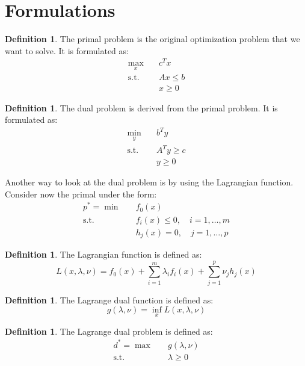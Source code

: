 \documentclass[12pt, openany]{report}
\theoremstyle{definition}
\newtheorem{definition}[thm]{Definition}
\begin{document}
\section{Formulations}
\begin{definition}
    The primal problem is the original optimization problem that we want to solve. It is formulated as:
    \begin{equation}
        \begin{aligned}
            \max_{x} \quad & c^T x \\
            \text{s.t.} \quad & A x \leq b \\
            & x \geq 0
        \end{aligned}
    \end{equation}
\end{definition}
\begin{definition}
    The dual problem is derived from the primal problem. It is formulated as:
    \begin{equation}
        \begin{aligned}
            \min_{y} \quad & b^T y \\
            \text{s.t.} \quad & A^T y \geq c \\
            & y \geq 0
        \end{aligned}
    \end{equation}
\end{definition}
Another way to look at the dual problem is by using the Lagrangian function. Consider now the primal under the form:
\begin{equation}
    \begin{aligned}
        p^* = \min \quad & f_0(x)\\
        \text{s.t.} \quad &f_i(x) \leq 0, \quad i = 1, \ldots, m \\
        & h_j(x) = 0, \quad  j = 1, \ldots, p
    \end{aligned}
\end{equation}
\begin{definition}
    The Lagrangian function is defined as:
    \begin{equation}
        L(x,\lambda, \nu) = f_0(x) + \sum_{i=1}^m \lambda_i f_i(x) + \sum_{j=1}^p \nu_j h_j(x)
    \end{equation}
\end{definition}
\begin{definition}
    The Lagrange dual function is defined as:
    \begin{equation}
        g(\lambda, \nu) = \inf_x L(x, \lambda, \nu)
    \end{equation}
\end{definition}
\begin{definition}
    The Lagrange dual problem is defined as:
    \begin{equation}
        \begin{aligned}
            d^* = \max \quad & g(\lambda, \nu) \\
            \text{s.t.} \quad & \lambda \geq 0
        \end{aligned}
    \end{equation}
\end{definition}
\end{document}
